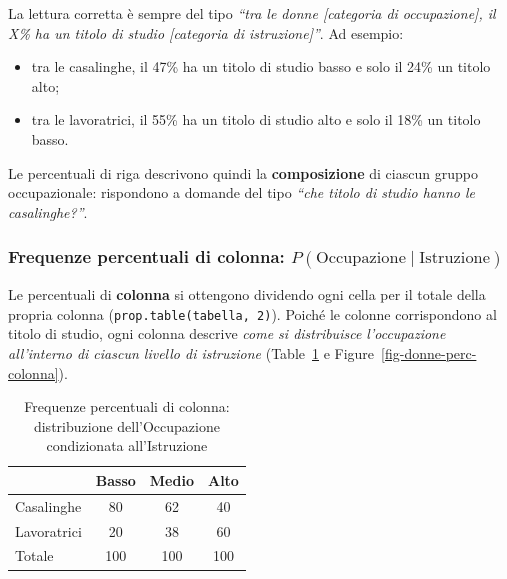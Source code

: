 \documentclass[
  a4paper,
  DIV=11,
  numbers=noendperiod]{scrreprt}
\providecommand{\tightlist}{%
  \setlength{\itemsep}{0pt}\setlength{\parskip}{0pt}}
\begin{document}
La lettura corretta è sempre del tipo \emph{``tra le donne {[}categoria
di occupazione{]}, il X\% ha un titolo di studio {[}categoria di
istruzione{]}''}. Ad esempio:

\begin{itemize}
\tightlist
\item
  tra le casalinghe, il 47\% ha un titolo di studio basso e solo il 24\%
  un titolo alto;
\item
  tra le lavoratrici, il 55\% ha un titolo di studio alto e solo il 18\%
  un titolo basso.
\end{itemize}

Le percentuali di riga descrivono quindi la \textbf{composizione} di
ciascun gruppo occupazionale: rispondono a domande del tipo \emph{``che
titolo di studio hanno le casalinghe?''}.

\subsubsection{\texorpdfstring{Frequenze percentuali di colonna:
\(P(\text{Occupazione} \mid \text{Istruzione})\)}{Frequenze percentuali di colonna: P(\textbackslash text\{Occupazione\} \textbackslash mid \textbackslash text\{Istruzione\})}}\label{frequenze-percentuali-di-colonna-ptextoccupazione-mid-textistruzione}

Le percentuali di \textbf{colonna} si ottengono dividendo ogni cella per
il totale della propria colonna (\texttt{prop.table(tabella,\ 2)}).
Poiché le colonne corrispondono al titolo di studio, ogni colonna
descrive \emph{come si distribuisce l'occupazione all'interno di ciascun
livello di istruzione} (Table~\ref{tbl-donne-perc-colonna} e
Figure~\ref{fig-donne-perc-colonna}).

\begin{longtable}[]{@{}lccc@{}}

\caption{\label{tbl-donne-perc-colonna}Frequenze percentuali di colonna:
distribuzione dell'Occupazione condizionata all'Istruzione}

\tabularnewline

\toprule\noalign{}
& Basso & Medio & Alto \\
\midrule\noalign{}
\endhead
\bottomrule\noalign{}
\endlastfoot
Casalinghe & 80 & 62 & 40 \\
Lavoratrici & 20 & 38 & 60 \\
Totale & 100 & 100 & 100 \\

\end{longtable}
\end{document}
